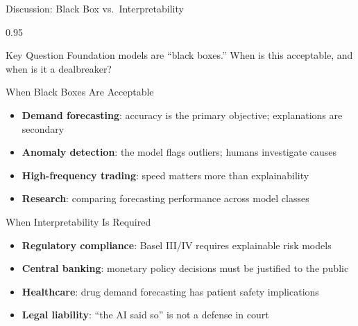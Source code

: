 \documentclass[9pt, aspectratio=169, t]{beamer}
\begin{document}
\begin{frame}{Discussion: Black Box vs.\ Interpretability}
    \begin{cminipage}{0.95\textwidth}
    {\small
    \begin{alertblock}{Key Question}
        Foundation models are ``black boxes.'' When is this acceptable, and when is it a dealbreaker?
    \end{alertblock}
    \begin{block}{When Black Boxes Are Acceptable}
        \begin{itemize}\setlength{\itemsep}{0pt}
            \item \textbf{Demand forecasting}: accuracy is the primary objective; explanations are secondary
            \item \textbf{Anomaly detection}: the model flags outliers; humans investigate causes
            \item \textbf{High-frequency trading}: speed matters more than explainability
            \item \textbf{Research}: comparing forecasting performance across model classes
        \end{itemize}
    \end{block}
    \begin{exampleblock}{When Interpretability Is Required}
        \begin{itemize}\setlength{\itemsep}{0pt}
            \item \textbf{Regulatory compliance}: Basel III/IV requires explainable risk models
            \item \textbf{Central banking}: monetary policy decisions must be justified to the public
            \item \textbf{Healthcare}: drug demand forecasting has patient safety implications
            \item \textbf{Legal liability}: ``the AI said so'' is not a defense in court
        \end{itemize}
    \end{exampleblock}
    }
    \end{cminipage}
\end{frame}
\end{document}
